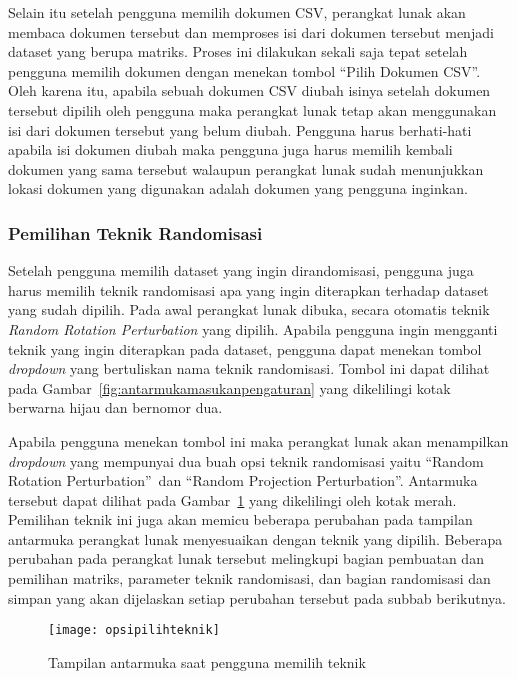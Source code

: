 Selain itu setelah pengguna memilih dokumen CSV, perangkat lunak akan membaca dokumen tersebut dan memproses isi dari dokumen tersebut menjadi dataset yang berupa matriks. Proses ini dilakukan sekali saja tepat setelah pengguna memilih dokumen dengan menekan tombol \textquotedblleft Pilih Dokumen CSV\textquotedblright. Oleh karena itu, apabila sebuah dokumen CSV diubah isinya setelah dokumen tersebut dipilih oleh pengguna maka perangkat lunak tetap akan menggunakan isi dari dokumen tersebut yang belum diubah. Pengguna harus berhati-hati apabila isi dokumen diubah maka pengguna juga harus memilih kembali dokumen yang sama tersebut walaupun perangkat lunak sudah menunjukkan lokasi dokumen yang digunakan adalah dokumen yang pengguna inginkan.

\subsubsection{Pemilihan Teknik Randomisasi}
\label{sec:pilihteknik}

Setelah pengguna memilih dataset yang ingin dirandomisasi, pengguna juga harus memilih teknik randomisasi apa yang ingin diterapkan terhadap dataset yang sudah dipilih. Pada awal perangkat lunak dibuka, secara otomatis teknik \textit{Random Rotation Perturbation} yang dipilih. Apabila pengguna ingin mengganti teknik yang ingin diterapkan pada dataset, pengguna dapat menekan tombol \textit{dropdown} yang bertuliskan nama teknik randomisasi. Tombol ini dapat dilihat pada Gambar~\ref{fig:antarmukamasukanpengaturan} yang dikelilingi kotak berwarna hijau dan bernomor dua.

Apabila pengguna menekan tombol ini maka perangkat lunak akan menampilkan \textit{dropdown} yang mempunyai dua buah opsi teknik randomisasi yaitu \textquotedblleft Random Rotation Perturbation\textquotedblright~dan \textquotedblleft Random Projection Perturbation\textquotedblright. Antarmuka tersebut dapat dilihat pada Gambar~\ref{fig:opsipilihteknik} yang dikelilingi oleh kotak merah. Pemilihan teknik ini juga akan memicu beberapa perubahan pada tampilan antarmuka perangkat lunak menyesuaikan dengan teknik yang dipilih. Beberapa perubahan pada perangkat lunak tersebut melingkupi bagian pembuatan dan pemilihan matriks, parameter teknik randomisasi, dan bagian randomisasi dan simpan yang akan dijelaskan setiap perubahan tersebut pada subbab berikutnya.

\begin{figure}
	\centering
	\texttt{[image: opsipilihteknik]}
	\caption{Tampilan antarmuka saat pengguna memilih teknik}
	\label{fig:opsipilihteknik}
\end{figure}


